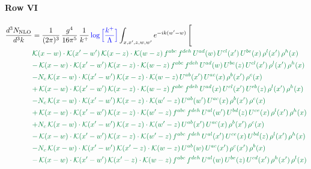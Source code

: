 \documentclass[10pt]{article}
\numberwithin{equation}{section}
\newcommand{\new}[1]{{\color{blue}#1}}
\begin{document}
\paragraph{Row VI}
\begin{align}
\frac{d^{3}N_{\mathrm{NLO}}}{d^{3}k} & = \frac{1}{(2\pi)^{3}}\,\frac{g^{4}}{16\pi^{5}}\,\frac{1}{k^{+}}\,\new{\log\Big[\frac{k^{+}}{\Lambda}\Big]}\int_{x,x',z,w,w'}e^{-ik(w'-w)}\,\Bigg[\notag\\ &{\color{JIM} \mathcal{K}(x-w)\cdot\mathcal{K}(x'-w')\,\mathcal{K}(x-z)\cdot\mathcal{K}(w-z)\,f^{abc}\,f^{deh}\,U^{ad}(w)\,U^{cl}(x')\,U^{be}(x)\,\rho^{l}(x')\,\rho^{h}(x)} \notag\\
&{\color{JIM} -\,\mathcal{K}(x-w)\cdot\mathcal{K}(x'-w')\,\mathcal{K}(x-z)\cdot\mathcal{K}(w-z)\,f^{abc}\,f^{deh}\,U^{ad}(w)\,U^{be}(z)\,U^{cl}(x')\,\rho^{l}(x')\,\rho^{h}(x)} \notag\\
&{\color{JIM} -N_{c}\,\mathcal{K}(x-w)\cdot\mathcal{K}(x'-w')\,\mathcal{K}(x-z)\cdot\mathcal{K}(w-z)\,U^{ab}(x')\,U^{ac}(x)\,\rho^{b}(x')\,\rho^{c}(x)} \notag\\
&{\color{JIM} +\,\mathcal{K}(x-w)\cdot\mathcal{K}(x'-w')\,\mathcal{K}(x-z)\cdot\mathcal{K}(w-z)\,f^{abc}\,f^{deh}\,U^{ad}(x)\,U^{cl}(x')\,U^{eb}(z)\,\rho^{l}(x')\,\rho^{h}(x)} \notag\\
&{\color{JIM} -N_{c}\,\mathcal{K}(x-w)\cdot\mathcal{K}(x'-w')\,\mathcal{K}(x-z)\cdot\mathcal{K}(w'-z)\,U^{ab}(w')\,U^{ac}(x)\,\rho^{b}(x')\,\rho^{c}(x)} \notag\\
&{\color{JIM} +\,\mathcal{K}(x-w)\cdot\mathcal{K}(x'-w')\,\mathcal{K}(x-z)\cdot\mathcal{K}(w'-z)\,f^{abc}\,f^{deh}\,U^{al}(w')\,U^{bd}(z)\,U^{ce}(x)\,\rho^{l}(x')\,\rho^{h}(x)} \notag\\
&{\color{JIM} +N_{c}\,\mathcal{K}(x-w)\cdot\mathcal{K}(x'-w')\,\mathcal{K}(x-z)\cdot\mathcal{K}(w'-z)\,U^{ab}(x')\,U^{ac}(x)\,\rho^{b}(x')\,\rho^{c}(x)} \notag\\
&{\color{JIM} -\,\mathcal{K}(x-w)\cdot\mathcal{K}(x'-w')\,\mathcal{K}(x-z)\cdot\mathcal{K}(w'-z)\,f^{abc}\,f^{deh}\,U^{al}(x')\,U^{ce}(x)\,U^{bd}(z)\,\rho^{l}(x')\,\rho^{h}(x)} \notag\\
&{\color{JIM} -N_{c}\,\mathcal{K}(x-w)\cdot\mathcal{K}(x'-w')\,\mathcal{K}(x'-z)\cdot\mathcal{K}(w-z)\,U^{ab}(w)\,U^{ac}(x')\,\rho^{c}(x')\,\rho^{b}(x)} \notag\\
&{\color{JIM} -\,\mathcal{K}(x-w)\cdot\mathcal{K}(x'-w')\,\mathcal{K}(x'-z)\cdot\mathcal{K}(w-z)\,f^{abc}\,f^{deh}\,U^{al}(w)\,U^{be}(z)\,U^{cd}(x')\,\rho^{h}(x')\,\rho^{l}(x)} \notag\\

\end{align}
\end{document}
